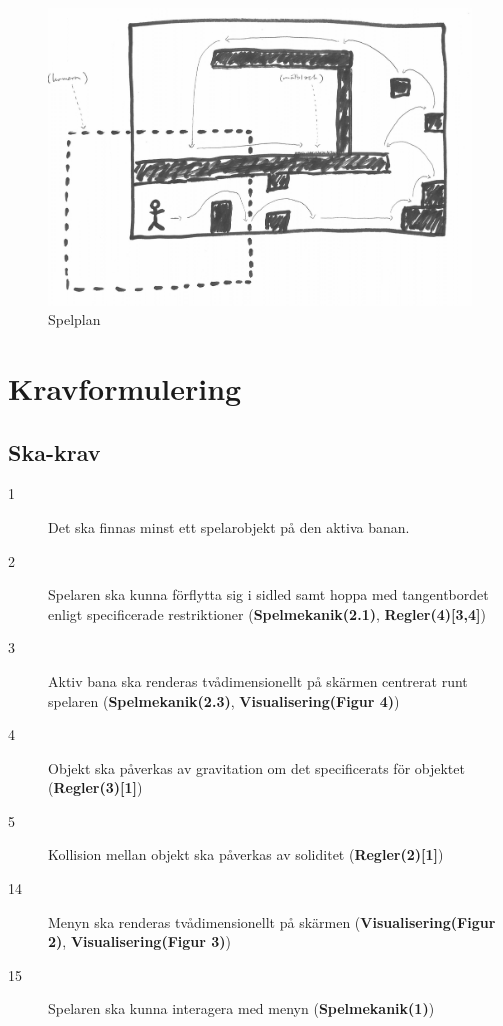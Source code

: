 \documentclass{TDP003mall}
\begin{document}
\begin{figure}[!h]
  \centering
  \includegraphics[scale=0.20]{spelplan}
  \caption{Spelplan}
  \label{Spelplan}
\end{figure}

\section{Kravformulering}
\subsection{Ska-krav}
\begin{description}
\item[1] Det ska finnas minst ett spelarobjekt på den aktiva banan.
\item[2] Spelaren ska kunna förflytta sig i sidled samt hoppa med tangentbordet enligt specificerade restriktioner (\textbf{Spelmekanik(2.1)}, \textbf{Regler(4)[3,4]})
\item[3] Aktiv bana ska renderas tvådimensionellt på skärmen centrerat runt spelaren (\textbf{Spelmekanik(2.3)}, \textbf{Visualisering(Figur 4)})
\item[4] Objekt ska påverkas av gravitation om det specificerats för objektet (\textbf{Regler(3)[1]})
\item[5] Kollision mellan objekt ska påverkas av soliditet (\textbf{Regler(2)[1]})
\item[14] Menyn ska renderas tvådimensionellt på skärmen (\textbf{Visualisering(Figur 2)}, \textbf{Visualisering(Figur 3)})
\item[15] Spelaren ska kunna interagera med menyn (\textbf{Spelmekanik(1)})
\end{description}
\end{document}
